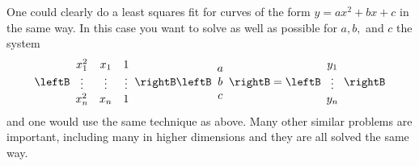 One could clearly do a least squares fit for curves of the form $
y=ax^{2}+bx+c$ in the same way. In this case you want to solve as well as
possible for $a,b,$ and $c$ the system 
\begin{equation*}
\leftB
\begin{array}{ccc}
x_{1}^{2} & x_{1} & 1 \\ 
\vdots & \vdots & \vdots \\ 
x_{n}^{2} & x_{n} & 1
\end{array}
\rightB \leftB 
\begin{array}{c}
a \\ 
b \\ 
c
\end{array}
\rightB =\leftB 
\begin{array}{c}
y_{1} \\ 
\vdots \\ 
y_{n}
\end{array}
\rightB
\end{equation*}
and one would use the same technique as above. Many other similar problems
are important, including many in higher dimensions and they are all solved
the same way.